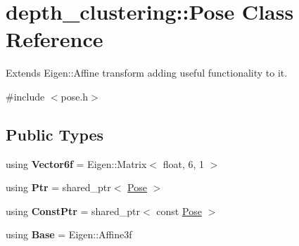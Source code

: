 \hypertarget{classdepth__clustering_1_1Pose}{}\section{depth\+\_\+clustering\+:\+:Pose Class Reference}
\label{classdepth__clustering_1_1Pose}


Extends Eigen\+::\+Affine transform adding useful functionality to it.  




{\ttfamily \#include $<$pose.\+h$>$}

\subsection*{Public Types}
\begin{DoxyCompactItemize}
\item 
\mbox{\label{classdepth__clustering_1_1Pose_a15a4a5c78b9b4b6ac2c091f614f161f3}} 
using {\bfseries Vector6f} = Eigen\+::\+Matrix$<$ float, 6, 1 $>$
\item 
\mbox{\label{classdepth__clustering_1_1Pose_a0d8c1c06707fe5c183b7910b3d886a00}} 
using {\bfseries Ptr} = shared\+\_\+ptr$<$ \hyperlink{classdepth__clustering_1_1Pose}{Pose} $>$
\item 
\mbox{\label{classdepth__clustering_1_1Pose_a15c52124f7b592fa4d60b5dc6f57b842}} 
using {\bfseries Const\+Ptr} = shared\+\_\+ptr$<$ const \hyperlink{classdepth__clustering_1_1Pose}{Pose} $>$
\item 
\mbox{\label{classdepth__clustering_1_1Pose_a21c3df0c69a753ab98cc065f33f73f7e}} 
using {\bfseries Base} = Eigen\+::\+Affine3f
\end{DoxyCompactItemize}
